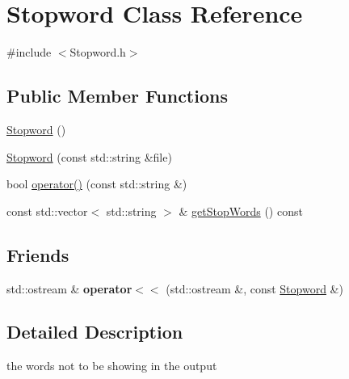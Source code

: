\hypertarget{classStopword}{\section{Stopword Class Reference}
\label{classStopword}
}


{\ttfamily \#include $<$Stopword.\-h$>$}

\subsection*{Public Member Functions}
\begin{DoxyCompactItemize}
\item 
\hyperlink{classStopword_a9580930ded0ee601ad610a078914a628}{Stopword} ()
\item 
\hyperlink{classStopword_a7905aacd5d59b997b50506a71d12a0f7}{Stopword} (const std\-::string \&file)
\item 
bool \hyperlink{classStopword_a2acde54983583632735c84fdb0c12d7e}{operator()} (const std\-::string \&)
\item 
const std\-::vector$<$ std\-::string $>$ \& \hyperlink{classStopword_a1b84b6472d0cbf2886f9d5a9b235b0d0}{get\-Stop\-Words} () const 
\end{DoxyCompactItemize}
\subsection*{Friends}
\begin{DoxyCompactItemize}
\item 
\hypertarget{classStopword_a33de0e6203154212a6d2f798efd40d67}{std\-::ostream \& {\bfseries operator$<$$<$} (std\-::ostream \&, const \hyperlink{classStopword}{Stopword} \&)}\label{classStopword_a33de0e6203154212a6d2f798efd40d67}

\end{DoxyCompactItemize}


\subsection{Detailed Description}
the words not to be showing in the output 

